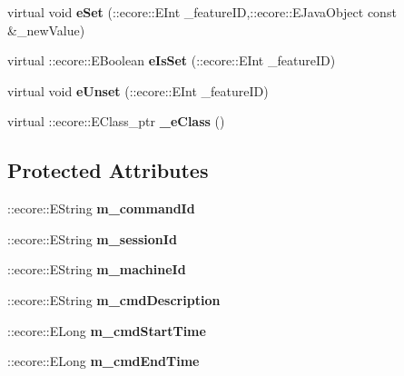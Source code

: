 \begin{DoxyCompactItemize}
\item 
\hypertarget{classUMS__Data_1_1Command_a383fa0384266578fbf4592d4005c466c}{
virtual void {\bfseries eSet} (::ecore::EInt \_\-featureID,::ecore::EJavaObject const \&\_\-newValue)}
\label{classUMS__Data_1_1Command_a383fa0384266578fbf4592d4005c466c}

\item 
\hypertarget{classUMS__Data_1_1Command_a13fadd120957e897612a66f335410a1c}{
virtual ::ecore::EBoolean {\bfseries eIsSet} (::ecore::EInt \_\-featureID)}
\label{classUMS__Data_1_1Command_a13fadd120957e897612a66f335410a1c}

\item 
\hypertarget{classUMS__Data_1_1Command_a9b70f55b5cbdc650488ba20577e50faf}{
virtual void {\bfseries eUnset} (::ecore::EInt \_\-featureID)}
\label{classUMS__Data_1_1Command_a9b70f55b5cbdc650488ba20577e50faf}

\item 
\hypertarget{classUMS__Data_1_1Command_aa7caabcfc7bf715337f2a2435258bcd7}{
virtual ::ecore::EClass\_\-ptr {\bfseries \_\-eClass} ()}
\label{classUMS__Data_1_1Command_aa7caabcfc7bf715337f2a2435258bcd7}

\end{DoxyCompactItemize}
\subsection*{Protected Attributes}
\begin{DoxyCompactItemize}
\item 
\hypertarget{classUMS__Data_1_1Command_a0b39d38fccda982161bdb4cb2d4a1e33}{
::ecore::EString {\bfseries m\_\-commandId}}
\label{classUMS__Data_1_1Command_a0b39d38fccda982161bdb4cb2d4a1e33}

\item 
\hypertarget{classUMS__Data_1_1Command_a228ce9dd2288d6b74a6d51af34c6d80f}{
::ecore::EString {\bfseries m\_\-sessionId}}
\label{classUMS__Data_1_1Command_a228ce9dd2288d6b74a6d51af34c6d80f}

\item 
\hypertarget{classUMS__Data_1_1Command_aaa757a4f68a55b49a622087fbf5dc8be}{
::ecore::EString {\bfseries m\_\-machineId}}
\label{classUMS__Data_1_1Command_aaa757a4f68a55b49a622087fbf5dc8be}

\item 
\hypertarget{classUMS__Data_1_1Command_a7aad32f9355d0b778107f19d2cf2fc99}{
::ecore::EString {\bfseries m\_\-cmdDescription}}
\label{classUMS__Data_1_1Command_a7aad32f9355d0b778107f19d2cf2fc99}

\item 
\hypertarget{classUMS__Data_1_1Command_a83d110336336532e3dfca161c8800878}{
::ecore::ELong {\bfseries m\_\-cmdStartTime}}
\label{classUMS__Data_1_1Command_a83d110336336532e3dfca161c8800878}

\item 
\hypertarget{classUMS__Data_1_1Command_ac7a1a49d616927212d67747e62e1bd99}{
::ecore::ELong {\bfseries m\_\-cmdEndTime}}
\label{classUMS__Data_1_1Command_ac7a1a49d616927212d67747e62e1bd99}

\end{DoxyCompactItemize}


